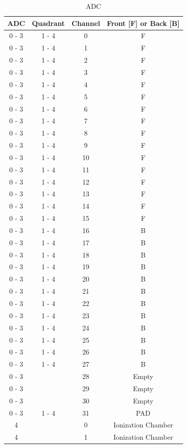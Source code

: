 \documentclass[twoside,english]{uiofysmaster/uiofysmaster}
\begin{document}
\begin{table}[ht] \centering 
\caption{ADC}
\label{tab:ADC}
\begin{tabular}{cccc}
\hline
ADC   & Quadrant & Channel & Front [F] or Back [B] \\
\hline
0 - 3 &  1 - 4   &    0    &    F      \\
0 - 3 &  1 - 4   &    1    &    F      \\
0 - 3 &  1 - 4   &    2    &    F      \\
0 - 3 &  1 - 4   &    3    &    F      \\
0 - 3 &  1 - 4   &    4    &    F      \\
0 - 3 &  1 - 4   &    5    &    F      \\
0 - 3 &  1 - 4   &    6    &    F      \\
0 - 3 &  1 - 4   &    7    &    F      \\
0 - 3 &  1 - 4   &    8    &    F      \\
0 - 3 &  1 - 4   &    9    &    F      \\
0 - 3 &  1 - 4   &    10   &    F      \\
0 - 3 &  1 - 4   &    11   &    F      \\
0 - 3 &  1 - 4   &    12   &    F      \\
0 - 3 &  1 - 4   &    13   &    F      \\
0 - 3 &  1 - 4   &    14   &    F      \\
0 - 3 &  1 - 4   &    15   &    F      \\
0 - 3 &  1 - 4   &    16   &    B      \\
0 - 3 &  1 - 4   &    17   &    B      \\
0 - 3 &  1 - 4   &    18   &    B      \\
0 - 3 &  1 - 4   &    19   &    B      \\
0 - 3 &  1 - 4   &    20   &    B      \\
0 - 3 &  1 - 4   &    21   &    B      \\
0 - 3 &  1 - 4   &    22   &    B      \\
0 - 3 &  1 - 4   &    23   &    B      \\
0 - 3 &  1 - 4   &    24   &    B      \\
0 - 3 &  1 - 4   &    25   &    B      \\
0 - 3 &  1 - 4   &    26   &    B      \\
0 - 3 &  1 - 4   &    27   &    B      \\
0 - 3 &            &    28   &    Empty  \\
0 - 3 &            &    29   &    Empty  \\
0 - 3 &            &    30   &    Empty  \\
0 - 3 &  1 - 4   &    31   &    PAD    \\
  4    &             &    0     &    Ionization Chamber \\
  4    &             &    1      &    Ionization Chamber \\
\hline
\end{tabular}
\end{table}
\end{document}
